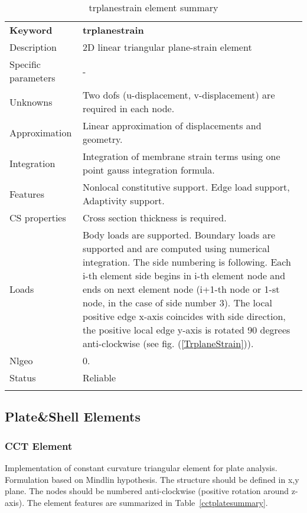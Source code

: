 \documentclass[a4paper]{article}
\newcommand{\param}[1]{\texttt{#1}} %
\newcommand{\templabel}{}%
\newcommand{\tempcaption}{}%
\newcounter{nelpar}
\newenvironment{elementsummary}[5]{%
  \gdef\tempcaption{#4}%
  \gdef\templabel{#5}%
  \setcounter{nelpar}{0}%
  \begin{center} %
    \begin{table}[!htb] %
      \begin{tabular}{|l|p{9cm}|}\hline %
        {\bf Keyword} & \bf{#1}\\ %
        {Description} & {#2}\\ %
        {Specific parameters} & {#3}\\ \hline %
}{
  \\ \hline %
      \end{tabular}%
      \caption{\tempcaption}%
      \label{\templabel}%
    \end{table}%
  \end{center}%
}
\newcommand{\elementParam}[1]{%
  \ifthenelse{\value{nelpar}>0} %
             {&{#1}}%
             {\setcounter{nelpar}{1}Parameters&{#1}}%
             \\%
}
\newcommand{\elementDescription}[2]{{#1} & {#2}\\ }
\begin{document}
\begin{elementsummary}{trplanestrain}{2D linear triangular plane-strain element}{-}{trplanestrain element summary}{trplanestrainsummary}
\elementDescription{Unknowns}{Two dofs (u-displacement, v-displacement) are required in each node.}
\elementDescription{Approximation}{Linear approximation of displacements and geometry.}
\elementDescription{Integration}{Integration of membrane strain terms using one point gauss integration formula.}
\elementDescription{Features}{Nonlocal constitutive support. Edge load support, Adaptivity support.}
\elementDescription{CS properties}{Cross section thickness is required.}
\elementDescription{Loads}{Body loads are supported. Boundary loads are supported and are computed  using numerical integration. The side numbering is following. Each i-th element side begins in i-th element node and ends on next element node (i+1-th node or 1-st node, in the case of side number 3). The local positive edge x-axis coincides with side direction, the positive local edge y-axis is rotated 90 degrees anti-clockwise (see fig. (\ref{TrplaneStrain})).}
\elementDescription{Nlgeo}{0.}
\elementDescription{Status}{Reliable}
\end{elementsummary}




\clearpage
\subsection{Plate\&Shell Elements}
\subsubsection {CCT Element}
\label{cct}
Implementation of constant curvature triangular element for plate
analysis. Formulation based on Mindlin hypothesis. The structure should be defined in x,y plane. 
The nodes should be numbered anti-clockwise (positive rotation around
z-axis). The element features are summarized in Table~\ref{cctplatesummary}.
\end{document}
